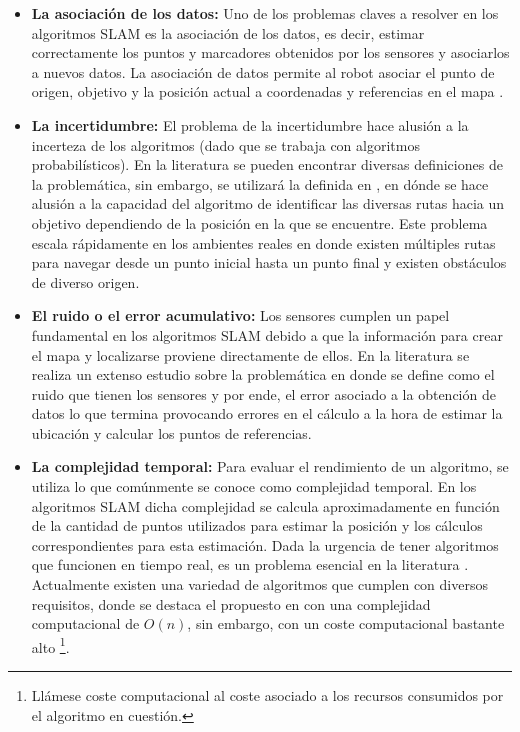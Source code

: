 \begin{itemize}
    \item \textbf{La asociación de los datos: } Uno de los problemas claves a resolver en los algoritmos SLAM es la asociación de los datos, es decir, estimar correctamente los puntos y marcadores obtenidos por los sensores y asociarlos a nuevos datos. La asociación de datos permite al robot asociar el punto de origen, objetivo y la posición actual a coordenadas y referencias en el mapa \cite{problem_dissanayake_2011}.
    
    \item \textbf{La incertidumbre: } El problema de la incertidumbre hace alusión a la incerteza de los algoritmos (dado que se trabaja con algoritmos probabilísticos). En la literatura se pueden encontrar diversas definiciones de la problemática, sin embargo, se utilizará la definida en \cite{5136492}, en dónde se hace alusión a la capacidad del algoritmo de identificar las diversas rutas hacia un objetivo dependiendo de la posición en la que se encuentre. Este problema escala rápidamente en los ambientes reales en donde existen múltiples rutas para navegar desde un punto inicial hasta un punto final y existen obstáculos de diverso origen.
    
    \item \textbf{El ruido o el error acumulativo: } Los sensores cumplen un papel fundamental en los algoritmos SLAM debido a que la información para crear el mapa y localizarse proviene directamente de ellos. En la literatura se realiza un extenso estudio sobre la problemática \cite{bordoni_noise_1990} en donde se define como el ruido que tienen los sensores y por ende, el error asociado a la obtención de datos lo que termina provocando errores en el cálculo a la hora de estimar la ubicación y calcular los puntos de referencias.
    
    \item \textbf{La complejidad temporal: } Para evaluar el rendimiento de un algoritmo, se utiliza lo que comúnmente se conoce como complejidad temporal. En los algoritmos SLAM dicha complejidad se calcula aproximadamente en función de la cantidad de puntos utilizados para estimar la posición y los cálculos correspondientes para esta estimación. Dada la urgencia de tener algoritmos que funcionen en tiempo real, es un problema esencial en la literatura \cite{977154}. Actualmente existen una variedad de algoritmos que cumplen con diversos requisitos, donde se destaca el propuesto en \cite{4399179} con una complejidad computacional de $O(n)$, sin embargo, con un coste computacional bastante alto \footnote{Llámese coste computacional al coste asociado a los recursos consumidos por el algoritmo en cuestión.}.
\end{itemize}

















